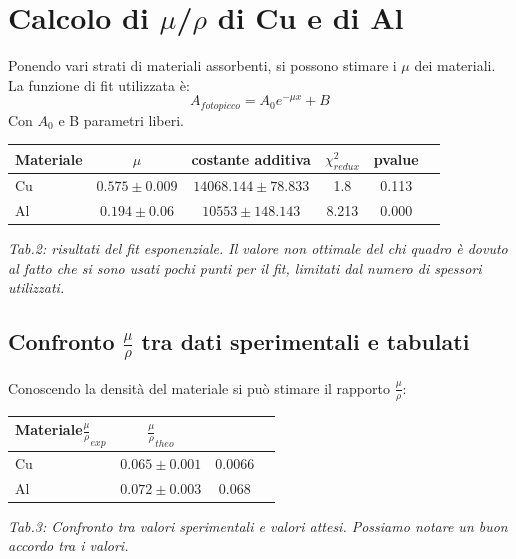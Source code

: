 \documentclass[a4paper]{article}
\begin{document}
\section{Calcolo di $\mu$/$\rho$ di Cu e di Al}
Ponendo vari strati di materiali assorbenti, si possono stimare i $\mu$ dei materiali. La funzione di fit utilizzata è:
\begin{equation}
A_{fotopicco}=A_{0}e^{-\mu x} + B
\end{equation}
Con $A_{0}$ e B parametri liberi.

\begin{center} 
		
		\begin{tabular}{lccccc}
			\hline
			\hline
			\textbf{Materiale}&\textbf{$\mu$ }	& \textbf{costante additiva}	& \textbf{$\chi^{2}_{redux}$} & \textbf{pvalue} \\
			\hline
			\hline
			 Cu&$0.575	\pm 0.009$	& $14068.144 \pm 78.833	$			& 1.8 &0.113	\\
			Al&$0.194 \pm 0.06$ &$10553 \pm 148.143$ & 8.213 & 0.000 \\
			\hline
			\hline
		\end{tabular}
		\linebreak
		
	\end{center}
	\emph{Tab.2: risultati del fit esponenziale. Il valore non ottimale del chi quadro è dovuto al fatto che si sono usati pochi punti per il fit, limitati dal numero di spessori utilizzati.} 
\subsection{Confronto $\frac{\mu}{\rho}$ tra dati sperimentali e tabulati}
Conoscendo la densità del materiale si può stimare il rapporto $\frac{\mu}{\rho}$:
\begin{center} 
		
		\begin{tabular}{lccc}
			\hline
			\hline
			\textbf{Materiale}\textbf{$\frac{\mu}{\rho}_{exp} $}	& \textbf{$\frac{\mu}{\rho}_{theo} $}	 \\
			\hline
			\hline
			 Cu&$0.065 \pm 0.001	$	& $0.0066$			\\
			Al&$0.072 \pm 0.003$ &$0.068$ \\
			\hline
			\hline
		\end{tabular}
		\linebreak
		
	\end{center}
	\emph{Tab.3: Confronto tra valori sperimentali e valori attesi. Possiamo notare un buon accordo tra i valori.} 
\end{document}
